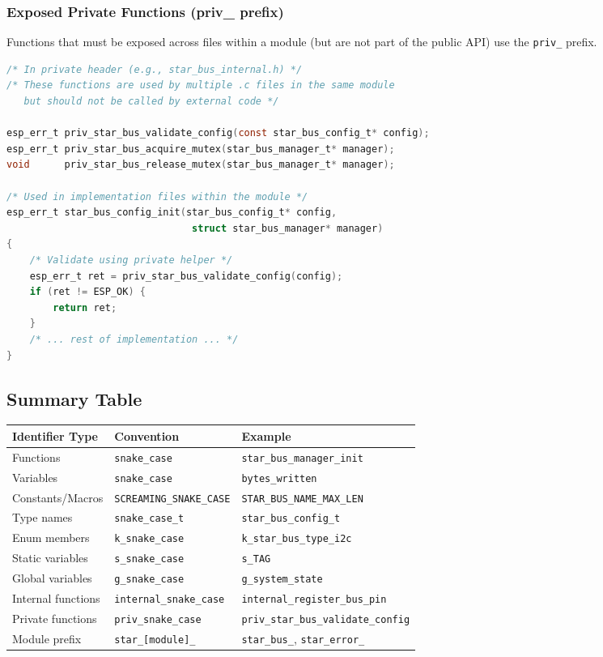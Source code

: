 \subsubsection{Exposed Private Functions (priv\_ prefix)}

Functions that must be exposed across files within a module (but are not part of the public API) use the \texttt{priv\_} prefix.

\begin{lstlisting}[language=C]
/* In private header (e.g., star_bus_internal.h) */
/* These functions are used by multiple .c files in the same module
   but should not be called by external code */

esp_err_t priv_star_bus_validate_config(const star_bus_config_t* config);
esp_err_t priv_star_bus_acquire_mutex(star_bus_manager_t* manager);
void      priv_star_bus_release_mutex(star_bus_manager_t* manager);

/* Used in implementation files within the module */
esp_err_t star_bus_config_init(star_bus_config_t* config,
                                struct star_bus_manager* manager)
{
    /* Validate using private helper */
    esp_err_t ret = priv_star_bus_validate_config(config);
    if (ret != ESP_OK) {
        return ret;
    }
    /* ... rest of implementation ... */
}
\end{lstlisting}

\subsection{Summary Table}

\begin{center}
\begin{tabular}{|l|l|l|}
\hline
\textbf{Identifier Type} & \textbf{Convention} & \textbf{Example} \\
\hline
Functions & \texttt{snake\_case} & \texttt{star\_bus\_manager\_init} \\
\hline
Variables & \texttt{snake\_case} & \texttt{bytes\_written} \\
\hline
Constants/Macros & \texttt{SCREAMING\_SNAKE\_CASE} & \texttt{STAR\_BUS\_NAME\_MAX\_LEN} \\
\hline
Type names & \texttt{snake\_case\_t} & \texttt{star\_bus\_config\_t} \\
\hline
Enum members & \texttt{k\_snake\_case} & \texttt{k\_star\_bus\_type\_i2c} \\
\hline
Static variables & \texttt{s\_snake\_case} & \texttt{s\_TAG} \\
\hline
Global variables & \texttt{g\_snake\_case} & \texttt{g\_system\_state} \\
\hline
Internal functions & \texttt{internal\_snake\_case} & \texttt{internal\_register\_bus\_pin} \\
\hline
Private functions & \texttt{priv\_snake\_case} & \texttt{priv\_star\_bus\_validate\_config} \\
\hline
Module prefix & \texttt{star\_[module]\_} & \texttt{star\_bus\_}, \texttt{star\_error\_} \\
\hline
\end{tabular}
\end{center}

